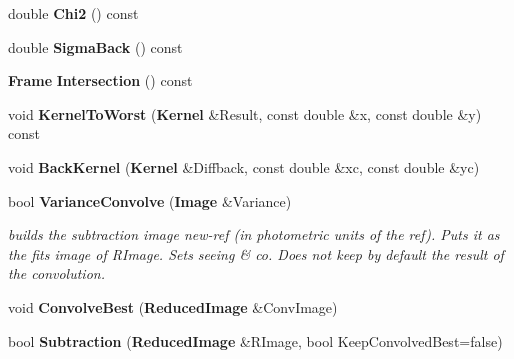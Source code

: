 \begin{CompactItemize}
\item 
{}
double {\bf Chi2} () const\label{class_psfmatch_a8}

\item 
{}
double {\bf Sigma\-Back} () const\label{class_psfmatch_a9}

\item 
{}
{\bf Frame} {\bf Intersection} () const\label{class_psfmatch_a10}

\item 
{}
void {\bf Kernel\-To\-Worst} ({\bf Kernel} \&Result, const double \&x, const double \&y) const\label{class_psfmatch_a11}

\item 
{}
void {\bf Back\-Kernel} ({\bf Kernel} \&Diffback, const double \&xc, const double \&yc)\label{class_psfmatch_a12}

\item 
{}
bool {\bf Variance\-Convolve} ({\bf Image} \&Variance)\label{class_psfmatch_a13}

\begin{CompactList}\small\item\em builds the subtraction image new-ref (in photometric units of the ref). Puts it as the fits image of RImage. Sets seeing \& co. Does not keep by default the result of the convolution.\item\end{CompactList}\item 
{}
void {\bf Convolve\-Best} ({\bf Reduced\-Image} \&Conv\-Image)\label{class_psfmatch_a14}

\item 
{}
bool {\bf Subtraction} ({\bf Reduced\-Image} \&RImage, bool Keep\-Convolved\-Best=false)\label{class_psfmatch_a15}


\end{CompactItemize}
